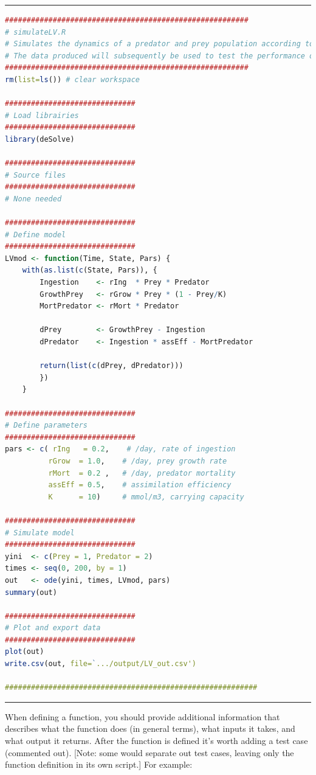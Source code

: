 \documentclass[12pt,letterpaper]{article}
\begin{document}
\noindent\rule{12cm}{0.4pt}
\begin{lstlisting}[language=R]
########################################################
# simulateLV.R
# Simulates the dynamics of a predator and prey population according to the Lotka-Volterra model.  
# The data produced will subsequently be used to test the performance of several population dynamic model-fitting routines.
########################################################
rm(list=ls()) # clear workspace

##############################
# Load librairies
##############################
library(deSolve)

############################## 
# Source files
##############################
# None needed

##############################
# Define model
##############################
LVmod <- function(Time, State, Pars) {
	with(as.list(c(State, Pars)), {
		Ingestion    <- rIng  * Prey * Predator
		GrowthPrey   <- rGrow * Prey * (1 - Prey/K)
		MortPredator <- rMort * Predator
		
		dPrey        <- GrowthPrey - Ingestion
		dPredator    <- Ingestion * assEff - MortPredator
		
		return(list(c(dPrey, dPredator)))
		})
	}

##############################
# Define parameters
##############################
pars <- c( rIng   = 0.2,    # /day, rate of ingestion
	      rGrow  = 1.0,    # /day, prey growth rate
	      rMort  = 0.2 ,   # /day, predator mortality
	      assEff = 0.5,    # assimilation efficiency
	      K      = 10)     # mmol/m3, carrying capacity

##############################
# Simulate model
##############################
yini  <- c(Prey = 1, Predator = 2)
times <- seq(0, 200, by = 1)
out   <- ode(yini, times, LVmod, pars)
summary(out)

##############################
# Plot and export data
##############################
plot(out)
write.csv(out, file=`.../output/LV_out.csv')

##########################################################
\end{lstlisting}
\noindent\rule{12cm}{0.4pt}

When defining a function, you should provide additional information that describes what the function does (in general terms), what inputs it takes, and what output it returns.  After the function is defined it's worth adding a test case (commented out).  [Note: some would separate out test cases, leaving only the function definition in its own script.]  For example:
\end{document}
